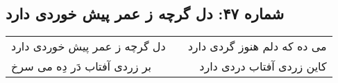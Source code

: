 \begin{center}
\section*{شماره ۴۷: دل گرچه ز عمر پیش خوردی دارد}
\label{sec:047}
\begin{longtable}{l p{0.5cm} r}
دل گرچه ز عمر پیش خوردی دارد
&&
می ده که دلم هنوز گردی دارد
\\
بر زردی آفتاب دَر دِه می سرخ
&&
کاین زردی آفتاب دردی دارد
\\
\end{longtable}
\end{center}

